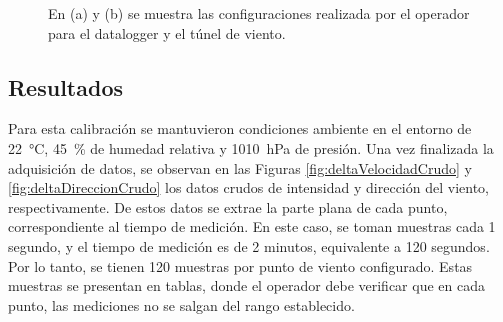 \begin{figure}[H]
\begin{minipage}[b]{0.18\textwidth}
    \end{minipage}  
    \hspace{1em} %
    \begin{minipage}[b]{0.23\textwidth}
        \centering
    \end{minipage}  
    \caption{En (a) y (b) se muestra las configuraciones realizada por el operador para el datalogger y el túnel de viento.}
    \label{fig:configEquiposDelta}
\end{figure} 


\subsection{Resultados}

Para esta calibración se mantuvieron condiciones ambiente en el entorno de \SI{22}{\degreeCelsius}, \SI{45}{\%} de humedad relativa y \SI{1010}{\hecto\pascal} de presión. Una vez finalizada la adquisición de datos, se observan en las Figuras \ref{fig:deltaVelocidadCrudo} y \ref{fig:deltaDireccionCrudo} los datos crudos de intensidad y dirección del viento, respectivamente. De estos datos se extrae la parte plana de cada punto, correspondiente al tiempo de medición. En este caso, se toman muestras cada 1 segundo, y el tiempo de medición es de 2 minutos, equivalente a 120 segundos. Por lo tanto, se tienen 120 muestras por punto de viento configurado. Estas muestras se presentan en tablas, donde el operador debe verificar que en cada punto, las mediciones no se salgan del rango establecido.

